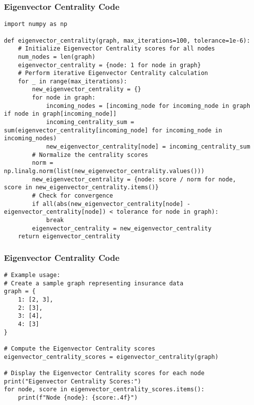 \begin{frame}[fragile]\frametitle{Eigenvector Centrality Code}
{\tiny
\begin{lstlisting}
import numpy as np

def eigenvector_centrality(graph, max_iterations=100, tolerance=1e-6):
    # Initialize Eigenvector Centrality scores for all nodes
    num_nodes = len(graph)
    eigenvector_centrality = {node: 1 for node in graph}
    # Perform iterative Eigenvector Centrality calculation
    for _ in range(max_iterations):
        new_eigenvector_centrality = {}
        for node in graph:
            incoming_nodes = [incoming_node for incoming_node in graph if node in graph[incoming_node]]
            incoming_centrality_sum = sum(eigenvector_centrality[incoming_node] for incoming_node in incoming_nodes)
            new_eigenvector_centrality[node] = incoming_centrality_sum
        # Normalize the centrality scores
        norm = np.linalg.norm(list(new_eigenvector_centrality.values()))
        new_eigenvector_centrality = {node: score / norm for node, score in new_eigenvector_centrality.items()}
        # Check for convergence
        if all(abs(new_eigenvector_centrality[node] - eigenvector_centrality[node]) < tolerance for node in graph):
            break
        eigenvector_centrality = new_eigenvector_centrality
    return eigenvector_centrality
\end{lstlisting}
}
\end{frame}



\begin{frame}[fragile]\frametitle{Eigenvector Centrality Code}
{\tiny
\begin{lstlisting}
# Example usage:
# Create a sample graph representing insurance data
graph = {
    1: [2, 3],
    2: [3],
    3: [4],
    4: [3]
}

# Compute the Eigenvector Centrality scores
eigenvector_centrality_scores = eigenvector_centrality(graph)

# Display the Eigenvector Centrality scores for each node
print("Eigenvector Centrality Scores:")
for node, score in eigenvector_centrality_scores.items():
    print(f"Node {node}: {score:.4f}")

\end{lstlisting}
}
\end{frame}


